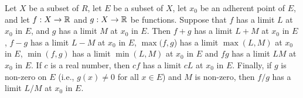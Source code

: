 \begin{prop}\label{9.3.14}
  Let \(X\) be a subset of \(R\), let \(E\) be a subset of \(X\), let \(x_0\) be an adherent point of \(E\), and let \(f : X \to \mathbb{R}\) and \(g : X \to \mathbb{R}\) be functions.
  Suppose that \(f\) has a limit \(L\) at \(x_0\) in \(E\), and \(g\) has a limit \(M\) at \(x_0\) in \(E\).
  Then \(f + g\) has a limit \(L + M\) at \(x_0\) in \(E\), \(f - g\) has a limit \(L - M\) at \(x_0\) in \(E\), \(\max(f, g\)) has a limit \(\max(L, M)\) at \(x_0\) in \(E\), \(\min(f, g)\) has a limit \(\min(L, M)\) at \(x_0\) in \(E\) and \(fg\) has a limit \(LM\) at \(x_0\) in \(E\).
  If \(c\) is a real number, then \(cf\) has a limit \(cL\) at \(x_0\) in \(E\).
  Finally, if \(g\) is non-zero on \(E\) (i.e., \(g(x) \neq 0\) for all \(x \in E\)) and \(M\) is non-zero, then \(f / g\) has a limit \(L / M\) at \(x_0\) in \(E\).
\end{prop}

